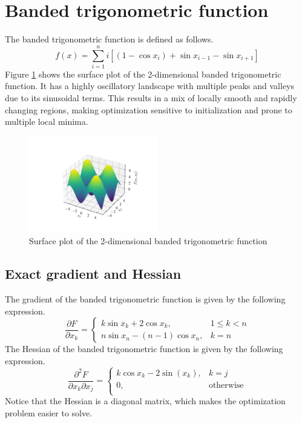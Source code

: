 \section{Banded trigonometric function}
\label{sec:banded_trigonometric_results}

The banded trigonometric function is defined as follows.
\begin{equation}
f(x) = \sum_{i=1}^n i[(1-\cos x_i) + \sin x_{i-1} - \sin x_{i+1}]
\end{equation}
Figure \ref{fig:banded_trigonometric_surf} shows the surface plot of the 2-dimensional banded trigonometric function.
It has a highly oscillatory landscape with multiple peaks and valleys due to its sinusoidal terms.
This results in a mix of locally smooth and rapidly changing regions, making optimization sensitive to initialization and prone to multiple local minima.
\begin{figure}
    \centering
    \includegraphics[width=0.5\textwidth]{figures/banded_trigonometric_surf.pdf}
    \caption{Surface plot of the 2-dimensional banded trigonometric function}
    \label{fig:banded_trigonometric_surf}
\end{figure}

\subsection{Exact gradient and Hessian}

The gradient of the banded trigonometric function is given by the following expression.
\begin{equation}
\frac{\partial F}{\partial x_k} = \left \{ \begin{array}{ll}
k\sin x_k + 2\cos x_k, & 1 \leq k < n \\
n\sin x_n - (n-1)\cos x_n, & k = n
\end{array} \right .
\end{equation}
The Hessian of the banded trigonometric function is given by the following expression.
\begin{equation}
\frac{\partial^2 F}{\partial x_k \partial x_j} = \left \{ \begin{array}{ll}
    k\cos x_k - 2\sin(x_k), & k = j \\
    0, & \text{otherwise} \\
\end{array} \right .
\end{equation}
Notice that the Hessian is a diagonal matrix, which makes the optimization problem easier to solve.

